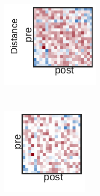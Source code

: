\begin{figure}[t!]
\begin{subfigure}[b]{1.10in}
  \end{subfigure}
  \\
  \hspace{1em}
  \begin{subfigure}[b]{1.25in}
    \centering
    \includegraphics[width=\textwidth]{figures/ch3/Dense-Distance.pdf}
  \end{subfigure}
  ~
  \begin{subfigure}[b]{1.10in}
    \centering
    \includegraphics[width=\textwidth]{figures/ch3/Bernoulli-Distance.pdf}

\end{subfigure}
\end{figure}
